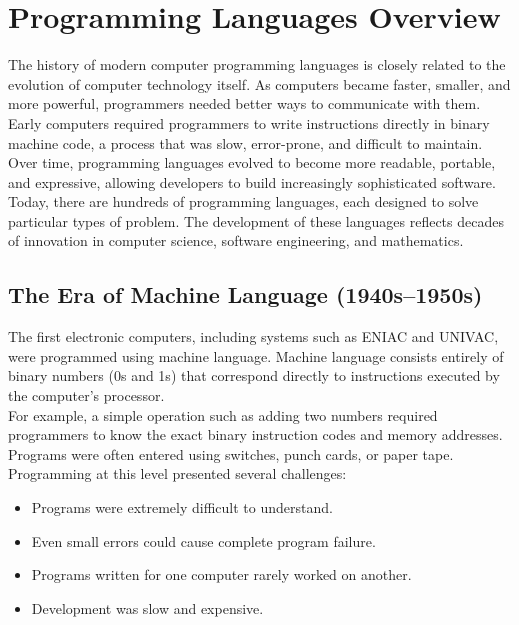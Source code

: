 \section{Programming Languages Overview}
The history of modern computer programming languages is closely related to the evolution of computer technology itself. As computers became faster, smaller, and more powerful, programmers needed better ways to communicate with them. Early computers required programmers to write instructions directly in binary machine code, a process that was slow, error-prone, and difficult to maintain. Over time, programming languages evolved to become more readable, portable, and expressive, allowing developers to build increasingly sophisticated software.\\

Today, there are hundreds of programming languages, each designed to solve particular types of problem. The development of these languages reflects decades of innovation in computer science, software engineering, and mathematics.

\subsection{The Era of Machine Language (1940s--1950s)}

The first electronic computers, including systems such as ENIAC and UNIVAC, were programmed using machine language. Machine language consists entirely of binary numbers (0s and 1s) that correspond directly to instructions executed by the computer's processor.\\

For example, a simple operation such as adding two numbers required programmers to know the exact binary instruction codes and memory addresses. Programs were often entered using switches, punch cards, or paper tape.\\

Programming at this level presented several challenges:

\begin{itemize}
    \item Programs were extremely difficult to understand.
    \item Even small errors could cause complete program failure.
    \item Programs written for one computer rarely worked on another.
    \item Development was slow and expensive.
\end{itemize}

